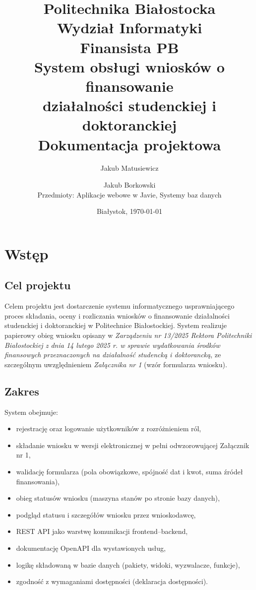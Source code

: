 \documentclass[12pt,a4paper]{article}
\title{
  \vspace{-2cm}
  \large Politechnika Białostocka \\
  \large Wydział Informatyki \\[1cm]
  \Huge \textbf{Finansista PB} \\[0.4cm]
  \Large System obsługi wniosków o finansowanie\\działalności studenckiej i doktoranckiej \\[1cm]
  \large Dokumentacja projektowa
}
\author{
  Jakub Matusiewicz \and Jakub Borkowski \\[0.3cm]
  \small Przedmioty: Aplikacje webowe w Javie, Systemy baz danych
}
\date{Białystok, \today}
\begin{document}
\maketitle
\thispagestyle{empty}
\newpage

\tableofcontents
\newpage

\section{Wstęp}
\label{sec:wstep}

\subsection{Cel projektu}
Celem projektu jest dostarczenie systemu informatycznego usprawniającego proces
składania, oceny i rozliczania wniosków o finansowanie działalności studenckiej
i doktoranckiej w Politechnice Białostockiej. System realizuje papierowy obieg
wniosku opisany w \emph{Zarządzeniu nr 13/2025 Rektora Politechniki Białostockiej
z dnia 14 lutego 2025 r. w sprawie wydatkowania środków finansowych przeznaczonych
na działalność studencką i doktorancką}, ze szczególnym uwzględnieniem
\emph{Załącznika nr 1} (wzór formularza wniosku).

\subsection{Zakres}
System obejmuje:
\begin{itemize}[leftmargin=*]
  \item rejestrację oraz logowanie użytkowników z rozróżnieniem ról,
  \item składanie wniosku w wersji elektronicznej w pełni odwzorowującej Załącznik nr 1,
  \item walidację formularza (pola obowiązkowe, spójność dat i kwot, suma źródeł finansowania),
  \item obieg statusów wniosku (maszyna stanów po stronie bazy danych),
  \item podgląd statusu i szczegółów wniosku przez wnioskodawcę,
  \item REST API jako warstwę komunikacji frontend--backend,
  \item dokumentację OpenAPI dla wystawionych usług,
  \item logikę składowaną w bazie danych (pakiety, widoki, wyzwalacze, funkcje),
  \item zgodność z wymaganiami dostępności (deklaracja dostępności).
\end{itemize}
\end{document}
